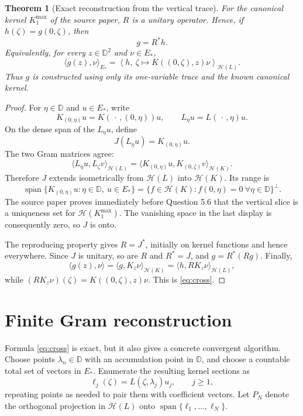 \documentclass[11pt]{article}
\newtheorem{theorem}{Theorem}
\newcommand{\D}{\mathbb D}
\newcommand{\Hk}{\mathcal H(K)}
\newcommand{\Hl}{\mathcal H(L)}
\begin{document}
\begin{theorem}[Exact reconstruction from the vertical trace]
\label{thm:reconstruct}
For the canonical kernel \(K^{\max}_1\) of the source paper, \(R\) is a
unitary operator.  Hence, if \(h(\zeta)=g(0,\zeta)\), then
\[
g=R^*h.
\]
Equivalently, for every \(z\in\D^2\) and \(\nu\in E_*\),
\begin{equation}
\label{eq:cross}
\langle g(z),\nu\rangle_{E_*}
=
\left\langle
h,\ \zeta\longmapsto K((0,\zeta),z)\nu
\right\rangle_{\Hl}.
\end{equation}
Thus \(g\) is constructed using only its one-variable trace and the
known canonical kernel.
\end{theorem}

\begin{proof}
For \(\eta\in\D\) and \(u\in E_*\), write
\[
K_{(0,\eta)}u=K(\,\cdot\,,(0,\eta))u,
\qquad
L_\eta u=L(\,\cdot\,,\eta)u.
\]
On the dense span of the \(L_\eta u\), define
\[
J(L_\eta u)=K_{(0,\eta)}u.
\]
The two Gram matrices agree:
\[
\langle L_\eta u,L_\zeta v\rangle_{\Hl}
=
\langle K_{(0,\eta)}u,K_{(0,\zeta)}v\rangle_{\Hk}.
\]
Therefore \(J\) extends isometrically from \(\Hl\) into \(\Hk\).
Its range is
\[
\overline{\operatorname{span}}\{K_{(0,\eta)}u:
\eta\in\D,\ u\in E_*\}
=
\{f\in\Hk:f(0,\eta)=0\ \forall\eta\in\D\}^{\perp}.
\]
The source paper proves immediately before Question 5.6 that the vertical
slice is a uniqueness set for \(\mathcal H(K^{\max}_1)\).  The vanishing
space in the last display is consequently zero, so \(J\) is onto.

The reproducing property gives \(R=J^*\), initially on kernel functions
and hence everywhere.  Since \(J\) is unitary, so are \(R\) and \(R^*=J\),
and \(g=R^*(Rg)\).  Finally,
\[
\langle g(z),\nu\rangle
=\langle g,K_z\nu\rangle_{\Hk}
=\langle h,RK_z\nu\rangle_{\Hl},
\]
while \((RK_z\nu)(\zeta)=K((0,\zeta),z)\nu\).  This is
\eqref{eq:cross}.
\end{proof}

\section{Finite Gram reconstruction}

Formula \eqref{eq:cross} is exact, but it also gives a concrete convergent
algorithm.  Choose points \(\lambda_n\in\D\) with an accumulation point in
\(\D\), and choose a countable total set of vectors in \(E_*\).  Enumerate
the resulting kernel sections as
\[
\ell_j(\zeta)=L(\zeta,\lambda_j)u_j,\qquad j\geq1,
\]
repeating points as needed to pair them with coefficient vectors.  Let
\(P_N\) denote the orthogonal projection in \(\Hl\) onto
\(\operatorname{span}\{\ell_1,\ldots,\ell_N\}\).
\end{document}
